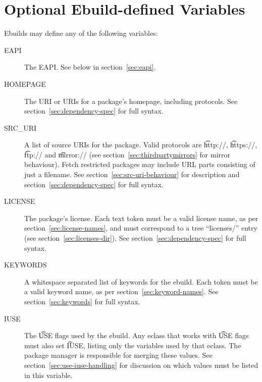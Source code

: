 \section{Optional Ebuild-defined Variables}

Ebuilds may define any of the following variables:

\begin{description}
\item[EAPI] The EAPI\@. See below in section~\ref{sec:eapi}.
\item[HOMEPAGE] The URI or URIs for a package's homepage, including protocols.
    See section~\ref{sec:dependency-spec} for full syntax.
\item[SRC_URI] A list of source URIs for the package. Valid protocols are \t{http://},
    \t{https://}, \t{ftp://} and \t{mirror://} (see section~\ref{sec:thirdpartymirrors} for mirror
    behaviour). Fetch restricted packages may include URL parts consisting of just a filename.
    See section~\ref{sec:src-uri-behaviour} for description and section~\ref{sec:dependency-spec}
    for full syntax.
\item[LICENSE] The package's license. Each text token must be a valid license name, as per
    section~\ref{sec:license-names}, and must correspond to a tree ``licenses/'' entry
    (see section~\ref{sec:licenses-dir}). See section~\ref{sec:dependency-spec} for full syntax.
    \label{ebuild-var-LICENSE}
\item[KEYWORDS] A whitespace separated list of keywords for the ebuild. Each token must be a valid
    keyword name, as per section~\ref{sec:keyword-names}. See section~\ref{sec:keywords} for full
    syntax.
\item[IUSE] The \t{USE} flags used by the ebuild. Any eclass that works with \t{USE} flags must
    also set \t{IUSE}, listing only the variables used by that eclass. The package manager is
    responsible for merging these values. See section~\ref{sec:use-iuse-handling} for discussion on
    which values must be listed in this variable.


\end{description}
